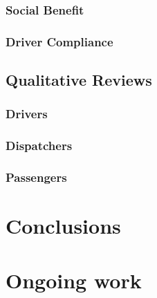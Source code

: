 \documentclass[11pt,letterpaper,]{report}
\begin{document}
\subsection{Social Benefit}

\subsection{Driver Compliance}

\section{Qualitative Reviews}

\subsection{Drivers}

\subsection{Dispatchers}

\subsection{Passengers}

\chapter{Conclusions}

\chapter{Ongoing work}



\end{document}
